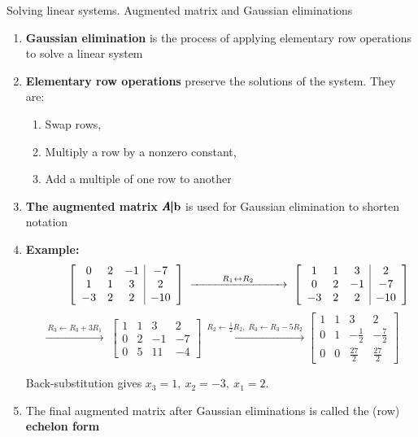 \documentclass[9pt]{beamer}
\begin{document}
\begin{frame}{Solving linear systems. Augmented matrix and Gaussian eliminations}
\small

\begin{enumerate}[leftmargin = 0.6cm, label = $\bullet$, rightmargin = 0.4cm]
    \item \textbf{Gaussian elimination} is the process of applying elementary row operations to solve a linear system

    \item \textbf{Elementary row operations} preserve the solutions of the system. They are:
    \begin{enumerate}[leftmargin = 0.6cm, label = $\bullet$, rightmargin = 0.4cm]
        \item Swap rows,
        \item Multiply a row by a nonzero constant,
        \item Add a multiple of one row to another
    \end{enumerate}

    \item \textbf{The augmented matrix} $\pmb{A|}{\bf b}$ is used for Gaussian elimination to shorten notation

    \item \textbf{Example:} 
    \[
    \hspace{1.1cm} 
    \left[
    \begin{array}{ccc|c}
    0 & 2 & -1 & -7\\
    1 & 1 & 3  & 2\\
    -3& 2 & 2  & -10
    \end{array}
    \right]
    \;\xrightarrow{\ \hspace{0.79cm} R_1\leftrightarrow R_2 \hspace{0.79cm} \ }\;
    \left[
    \begin{array}{ccc|c}
    1 & 1 & 3  & 2\\
    0 & 2 & -1 & -7\\
    -3& 2 & 2  & -10
    \end{array}
    \right]
    \]
    \[
    \xrightarrow{\ R_3\leftarrow R_3+3R_1\ }\;
    \left[
    \begin{array}{ccc|c}
    1 & 1 & 3  & 2\\
    0 & 2 & -1 & -7\\
    0 & 5 & 11 & -4
    \end{array}
    \right]
    \xrightarrow{\ R_2\leftarrow \tfrac12 R_2,\; R_3\leftarrow R_3-5R_2\ }
    \left[
    \begin{array}{ccc|c}
    1 & 1 & 3  & 2\\
    0 & 1 & -\tfrac12 & -\tfrac72\\
    0 & 0 & \tfrac{27}{2} & \tfrac{27}{2}
    \end{array}
    \right]
    \]
    
    Back-substitution gives \(x_3=1,\ x_2=-3,\ x_1=2\).

    \item The final augmented matrix after Gaussian eliminations is called the (row) \textbf{echelon form}
\end{enumerate}

\end{frame}
\end{document}
